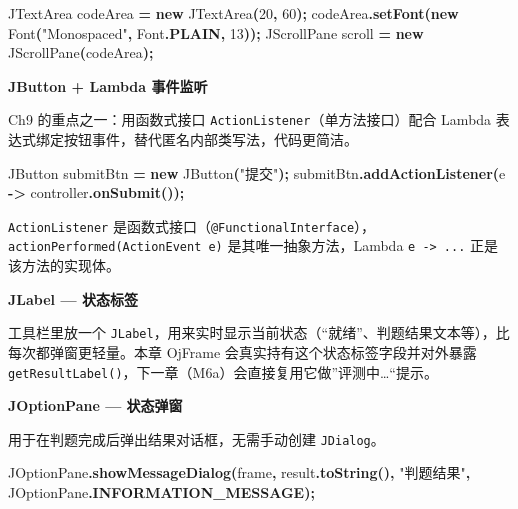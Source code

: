 \documentclass[
  11pt,
]{ctexart}
\newenvironment{Shaded}{\begin{snugshade}}{\end{snugshade}}
\newcommand{\BuiltInTok}[1]{#1}
\newcommand{\DecValTok}[1]{\textcolor[rgb]{0.00,0.00,0.81}{#1}}
\newcommand{\FunctionTok}[1]{\textcolor[rgb]{0.13,0.29,0.53}{\textbf{#1}}}
\newcommand{\KeywordTok}[1]{\textcolor[rgb]{0.13,0.29,0.53}{\textbf{#1}}}
\newcommand{\NormalTok}[1]{#1}
\newcommand{\OperatorTok}[1]{\textcolor[rgb]{0.81,0.36,0.00}{\textbf{#1}}}
\newcommand{\StringTok}[1]{\textcolor[rgb]{0.31,0.60,0.02}{#1}}
\begin{document}
\begin{Shaded}
\begin{Highlighting}[]
\BuiltInTok{JTextArea}\NormalTok{ codeArea }\OperatorTok{=} \KeywordTok{new} \BuiltInTok{JTextArea}\OperatorTok{(}\DecValTok{20}\OperatorTok{,} \DecValTok{60}\OperatorTok{);}
\NormalTok{codeArea}\OperatorTok{.}\FunctionTok{setFont}\OperatorTok{(}\KeywordTok{new} \BuiltInTok{Font}\OperatorTok{(}\StringTok{"Monospaced"}\OperatorTok{,} \BuiltInTok{Font}\OperatorTok{.}\FunctionTok{PLAIN}\OperatorTok{,} \DecValTok{13}\OperatorTok{));}
\BuiltInTok{JScrollPane}\NormalTok{ scroll }\OperatorTok{=} \KeywordTok{new} \BuiltInTok{JScrollPane}\OperatorTok{(}\NormalTok{codeArea}\OperatorTok{);}
\end{Highlighting}
\end{Shaded}

\textbf{JButton + Lambda 事件监听}

Ch9 的重点之一：用函数式接口 \texttt{ActionListener}（单方法接口）配合
Lambda 表达式绑定按钮事件，替代匿名内部类写法，代码更简洁。

\begin{Shaded}
\begin{Highlighting}[]
\BuiltInTok{JButton}\NormalTok{ submitBtn }\OperatorTok{=} \KeywordTok{new} \BuiltInTok{JButton}\OperatorTok{(}\StringTok{"提交"}\OperatorTok{);}
\NormalTok{submitBtn}\OperatorTok{.}\FunctionTok{addActionListener}\OperatorTok{(}\NormalTok{e }\OperatorTok{{-}\textgreater{}}\NormalTok{ controller}\OperatorTok{.}\FunctionTok{onSubmit}\OperatorTok{());}
\end{Highlighting}
\end{Shaded}

\texttt{ActionListener}
是函数式接口（\texttt{@FunctionalInterface}），\texttt{actionPerformed(ActionEvent\ e)}
是其唯一抽象方法，Lambda \texttt{e\ -\textgreater{}\ ...}
正是该方法的实现体。

\textbf{JLabel --- 状态标签}

工具栏里放一个
\texttt{JLabel}，用来实时显示当前状态（``就绪''、判题结果文本等），比每次都弹窗更轻量。本章
OjFrame 会真实持有这个状态标签字段并对外暴露
\texttt{getResultLabel()}，下一章（M6a）会直接复用它做''评测中\ldots``提示。

\textbf{JOptionPane --- 状态弹窗}

用于在判题完成后弹出结果对话框，无需手动创建 \texttt{JDialog}。

\begin{Shaded}
\begin{Highlighting}[]
\BuiltInTok{JOptionPane}\OperatorTok{.}\FunctionTok{showMessageDialog}\OperatorTok{(}\NormalTok{frame}\OperatorTok{,}\NormalTok{ result}\OperatorTok{.}\FunctionTok{toString}\OperatorTok{(),} \StringTok{"判题结果"}\OperatorTok{,}
    \BuiltInTok{JOptionPane}\OperatorTok{.}\FunctionTok{INFORMATION\_MESSAGE}\OperatorTok{);}
\end{Highlighting}
\end{Shaded}
\end{document}
